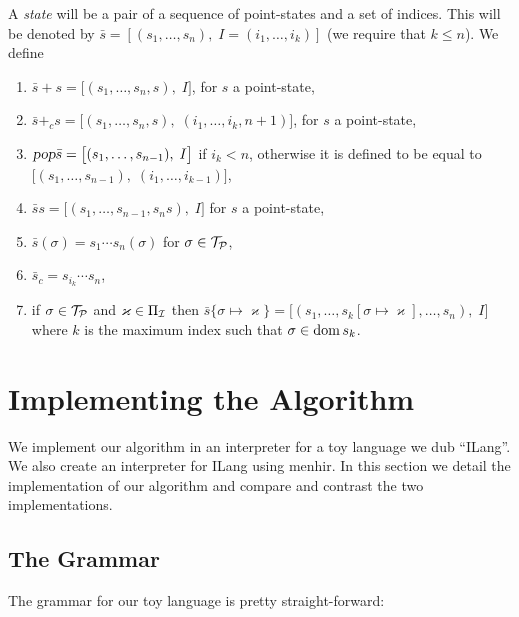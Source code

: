 \documentclass{llncs}
\newcounter{algo}
\begin{document}
A \textit{state} will be a pair of a sequence of point-states and a set of indices.
This will be denoted by $\bar s=[(s_1,\dots,s_n),\;I=(i_1,\dots,i_k)]$ (we require that $k\leq n$).
We define
\begin{enumerate}
    \item $\bar s+s=\bigl[(s_1,\dots,s_n,s),\;I\bigr]$, for $s$ a point-state,
    \item $\bar s+_cs=\bigl[(s_1,\dots,s_n,s),\;(i_1,\dots,i_k,n+1)\bigr]$, for $s$ a point-state,
    \item $\textsl{pop}\bar s=\bigl[(s_1,\dots,s_{n-1}),\;I\bigr]$ if $i_k<n$, otherwise it is defined to be equal to $\bigl[(s_1,\dots,s_{n-1}),\;(i_1,\dots,i_{k-1})\bigr]$,
    \item $\bar ss=\bigl[(s_1,\dots,s_{n-1},s_ns),\;I\bigr]$ for $s$ a point-state,
    \item $\bar s(\sigma)=s_1\cdots s_n(\sigma)$ for $\sigma\in\mathcal T_{\mathcal P}$,
    \item $\bar s_c=s_{i_k}\cdots s_n$,
    \item if $\sigma\in\mathcal T_{\mathcal P}$ and $\varkappa\in\Pi_{\mathcal I}$ then $\bar s\{\sigma\mapsto\varkappa\}=\bigl[(s_1,\dots,s_k[\sigma\mapsto\varkappa],\dots,s_n),\;I\bigr]$ where $k$ is the maximum index such that
    $\sigma\in\operatorname{dom} s_k$.
\end{enumerate}

\section{Implementing the Algorithm}

We implement our algorithm in an interpreter for a toy language we dub ``ILang''.
We also create an interpreter for ILang using menhir\cite{menhir}.
In this section we detail the implementation of our algorithm and compare and contrast the two implementations.

\subsection{The Grammar}

The grammar for our toy language is pretty straight-forward:
\end{document}
